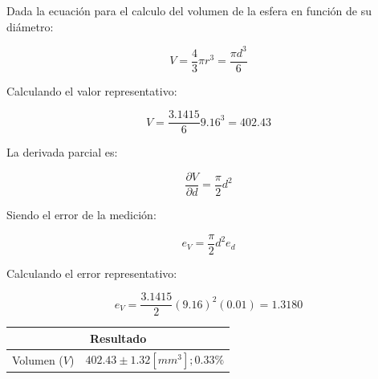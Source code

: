 \documentclass[letter,11pt]{article}
\begin{document}
Dada la ecuación para el calculo del volumen de la esfera en función de su
diámetro:

\begin{equation}
    V = \frac{4}{3} \pi r^3 = \frac{\pi d^3}{6}
\tag{esfera}
\end{equation}

Calculando el valor representativo:

\begin{equation*}
    V = \frac{3.1415}{6} 9.16^3 = 402.43
\end{equation*}

La derivada parcial es:

\begin{equation}
    \frac{\partial{V}}{\partial{d}} = \frac{\pi}{2} d^2
\end{equation}

Siendo el error de la medición:

\begin{equation}
    e_V = \frac{\pi}{2} d^2 e_d
\end{equation}

Calculando el error representativo:

\begin{equation*}
    e_V = \frac{3.1415}{2}(9.16)^2(0.01) = 1.3180
\end{equation*}

\begin{center}
\begin{tabular}{|c|>{\centering}m{5.0cm}<{\centering}|}
\hline
\multicolumn{2}{|c|}{\textbf{Resultado}}
\tabularnewline \hline
Volumen ($V$) & $402.43 \pm 1.32 [mm^3]; 0.33\%$ \tabularnewline \hline
\end{tabular}
\end{center}
\end{document}
